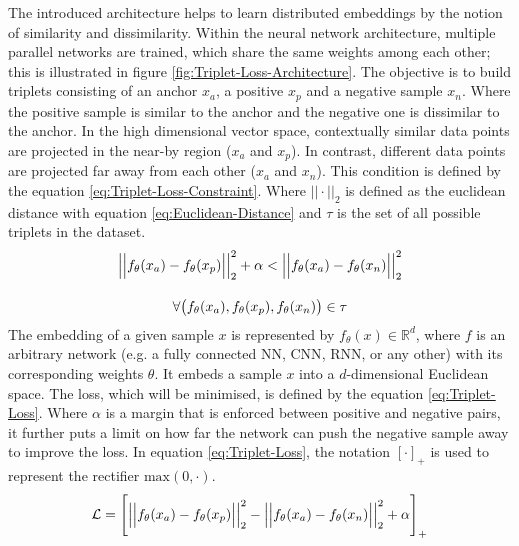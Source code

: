 \noindent
The introduced architecture helps to learn distributed embeddings by the notion of similarity and dissimilarity. Within the neural network architecture, multiple parallel networks are trained, which share the same weights among each other; this is illustrated in figure \ref{fig:Triplet-Loss-Architecture}. The objective is to build triplets consisting of an anchor $x_a$, a positive $x_p$ and a negative sample $x_n$. Where the positive sample is similar to the anchor and the negative one is dissimilar to the anchor. In the high dimensional vector space, contextually similar data points are projected in the near-by region ($x_a$ and $x_p$). In contrast, different data points are projected far away from each other ($x_a$ and $x_n$). This condition is defined by the equation \ref{eq:Triplet-Loss-Constraint}. Where $|| \cdot ||_2$ is defined as the euclidean distance with equation \ref{eq:Euclidean-Distance} and $\tau$ is the set of all possible triplets in the dataset.
\begin{equation}
    \centering
    \begin{gathered}
        \Big|\Big|f_\theta(x_a) - f_\theta(x_p)\Big|\Big|_2^2 + \alpha < \Big|\Big|f_\theta(x_a) - f_\theta(x_n)\Big|\Big|_2^2 \\[10pt]
        \forall \big(f_\theta(x_a), f_\theta(x_p), f_\theta(x_n)\big) \in \tau
    \end{gathered}
    \label{eq:Triplet-Loss-Constraint}
\end{equation}
The embedding of a given sample $x$ is represented by $f_\theta(x) \in \mathbb{R}^d$, where $f$ is an arbitrary network (e.g. a fully connected \gls{NN}, \gls{CNN}, \gls{RNN}, or any other) with its corresponding weights $\theta$. It embeds a sample $x$ into a $d$-dimensional Euclidean space. The loss, which will be minimised, is defined by the equation \ref{eq:Triplet-Loss}. Where $\alpha$ is a margin that is enforced between positive and negative pairs, it further puts a limit on how far the network can push the negative sample away to improve the loss. In equation \ref{eq:Triplet-Loss}, the notation $[\cdot]_+$ is used to represent the rectifier $\text{max}(0, \cdot)$.
\begin{equation}
    \centering
    \mathcal{L} = \Bigg [\Big|\Big|f_\theta(x_a) - f_\theta(x_p)\Big|\Big|_2^2 - \Big|\Big|f_\theta(x_a) - f_\theta(x_n)\Big|\Big|_2^2 + \alpha \Bigg]_+
    \label{eq:Triplet-Loss}
\end{equation}
